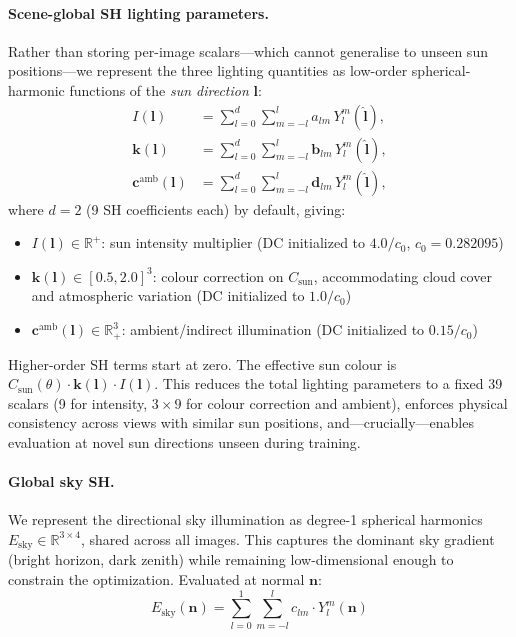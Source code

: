 \paragraph{Scene-global SH lighting parameters.}
Rather than storing per-image scalars---which cannot generalise to unseen sun positions---we represent the three lighting quantities as low-order spherical-harmonic functions of the \emph{sun direction} $\mathbf{l}$:
\begin{align}
    I(\mathbf{l})                       & = \sum_{l=0}^{d}\sum_{m=-l}^{l} a_{lm}\, Y_l^m(\hat{\mathbf{l}}), \label{eq:scene_sh_int}          \\
    \mathbf{k}(\mathbf{l})              & = \sum_{l=0}^{d}\sum_{m=-l}^{l} \mathbf{b}_{lm}\, Y_l^m(\hat{\mathbf{l}}), \label{eq:scene_sh_col} \\
    \mathbf{c}^{\text{amb}}(\mathbf{l}) & = \sum_{l=0}^{d}\sum_{m=-l}^{l} \mathbf{d}_{lm}\, Y_l^m(\hat{\mathbf{l}}), \label{eq:scene_sh_amb}
\end{align}
where $d = 2$ (9 SH coefficients each) by default, giving:
\begin{itemize}
    \item $I(\mathbf{l}) \in \mathbb{R}^+$: sun intensity multiplier (DC initialized to $4.0 / c_0$, $c_0 = 0.282095$)
    \item $\mathbf{k}(\mathbf{l}) \in [0.5, 2.0]^3$: colour correction on $C_{\text{sun}}$, accommodating cloud cover and atmospheric variation (DC initialized to $1.0 / c_0$)
    \item $\mathbf{c}^{\text{amb}}(\mathbf{l}) \in \mathbb{R}^{3}_+$: ambient/indirect illumination (DC initialized to $0.15 / c_0$)
\end{itemize}
Higher-order SH terms start at zero.
The effective sun colour is $C_{\text{sun}}(\theta) \cdot \mathbf{k}(\mathbf{l}) \cdot I(\mathbf{l})$.
This reduces the total lighting parameters to a fixed 39 scalars (9 for intensity, $3{\times}9$ for colour correction and ambient), enforces physical consistency across views with similar sun positions, and---crucially---enables evaluation at novel sun directions unseen during training.

\paragraph{Global sky SH.}
We represent the directional sky illumination as degree-1 spherical harmonics $E_{\text{sky}} \in \mathbb{R}^{3 \times 4}$, shared across all images.
This captures the dominant sky gradient (bright horizon, dark zenith) while remaining low-dimensional enough to constrain the optimization.
Evaluated at normal $\mathbf{n}$:
\begin{equation}
    E_{\text{sky}}(\mathbf{n}) = \sum_{l=0}^{1}\sum_{m=-l}^{l} c_{lm} \cdot Y_l^m(\mathbf{n})
    \label{eq:sky_sh}
\end{equation}

